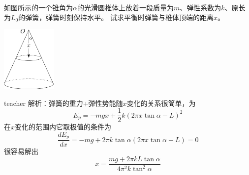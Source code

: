 \begin{example}
如图所示的一个锥角为$\alpha$的光滑圆椎体上放着一段质量为$m$、弹性系数为$k$、原长为$L_0$的弹簧，弹簧时刻保持水平。
试求平衡时弹簧与椎体顶端的距离$x$。
\begin{flushright}
\includegraphics[width = 0.2\textwidth]{images/cal-9.pdf} 
\end{flushright}
\begin{taggedblock}{teacher}
\noindent
解析：弹簧的重力+弹性势能随$x$变化的关系很简单，为
\[E_p=-mgx+\frac{1}{2}k(2\pi x\tan\alpha-L)^2\]
在$x$变化的范围内它取极值的条件为
\[\frac{dE_p}{dx}=-mg+2\pi k\tan\alpha(2\pi x\tan\alpha-L)=0\]
很容易解出
\[
x = \frac{mg+2\pi k L\tan\alpha}{4\pi^2 k \tan^2\alpha}
\]
\end{taggedblock}
\end{example}

